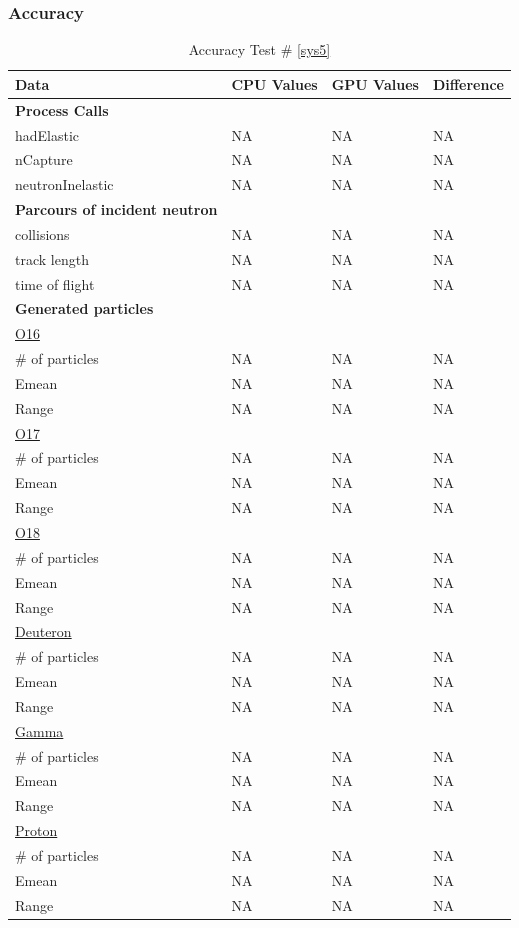 \documentclass[12pt]{article}
\begin{document}
	\subsubsection{Accuracy}
		\begin{table}[!htbp]
		\centering
		\caption{Accuracy Test \# \ref{sys5}}\label{_acc}
		\begin{tabular}{llll}
		\toprule
		\bf Data & CPU Values & GPU Values & Difference\\\midrule
		\bf Process Calls&&&\\
		hadElastic&NA&NA&NA\\
		nCapture&NA&NA&NA\\
		neutronInelastic&NA&NA&NA\\ 
		\bf Parcours of incident neutron&&&\\
		collisions&NA&NA&NA\\
		track length&NA&NA&NA\\
		time of flight&NA&NA&NA\\
		\bf Generated particles&&&\\
		\underline{O16}&&&\\
		\# of particles&NA&NA&NA\\
		Emean&NA&NA&NA\\
		Range&NA&NA&NA\\
		\underline{O17}&&&\\
		\# of particles&NA&NA&NA\\
		Emean&NA&NA&NA\\
		Range&NA&NA&NA\\
		\underline{O18}&&&\\
		\# of particles&NA&NA&NA\\
		Emean&NA&NA&NA\\
		Range&NA&NA&NA\\
		\underline{Deuteron}&&&\\
		\# of particles&NA&NA&NA\\
		Emean&NA&NA&NA\\
		Range&NA&NA&NA\\
		\underline{Gamma}&&&\\
		\# of particles&NA&NA&NA\\
		Emean&NA&NA&NA\\
		Range&NA&NA&NA\\
		\underline{Proton}&&&\\
		\# of particles&NA&NA&NA\\
		Emean&NA&NA&NA\\
		Range&NA&NA&NA\\
		\end{tabular}
		\end{table}
		\break
\end{document}
